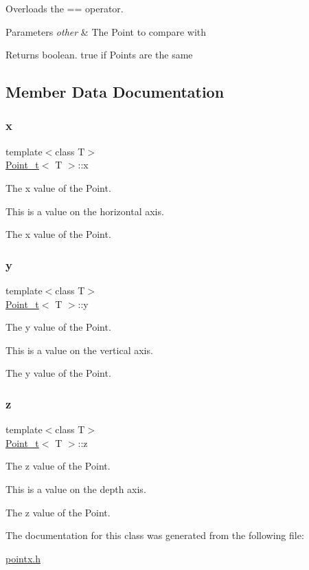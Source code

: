 Overloads the == operator. 


\begin{DoxyParams}{Parameters}
{\em other} & The Point to compare with\\
\hline
\end{DoxyParams}
\begin{DoxyReturn}{Returns}
boolean. true if Points are the same 
\end{DoxyReturn}


\subsection{Member Data Documentation}
\mbox{\label{class_point__t_add0b296463fdccbde77953e480ae3d2d}} 
\subsubsection{\texorpdfstring{x}{x}}
{\footnotesize\ttfamily template$<$class T$>$ \\
\hyperlink{class_point__t}{Point\+\_\+t}$<$ T $>$\+::x}



The x value of the Point. 

This is a value on the horizontal axis.

The x value of the Point. \mbox{\label{class_point__t_a2c1d504b00b0cf59edd07ad7611bbfde}} 
\subsubsection{\texorpdfstring{y}{y}}
{\footnotesize\ttfamily template$<$class T$>$ \\
\hyperlink{class_point__t}{Point\+\_\+t}$<$ T $>$\+::y}



The y value of the Point. 

This is a value on the vertical axis.

The y value of the Point. \mbox{\label{class_point__t_a7480dcfc81f5cf2eff6434da05b26c18}} 
\subsubsection{\texorpdfstring{z}{z}}
{\footnotesize\ttfamily template$<$class T$>$ \\
\hyperlink{class_point__t}{Point\+\_\+t}$<$ T $>$\+::z}



The z value of the Point. 

This is a value on the depth axis.

The z value of the Point. 

The documentation for this class was generated from the following file\+:\begin{DoxyCompactItemize}
\item 
\hyperlink{pointx_8h}{pointx.\+h}\end{DoxyCompactItemize}
